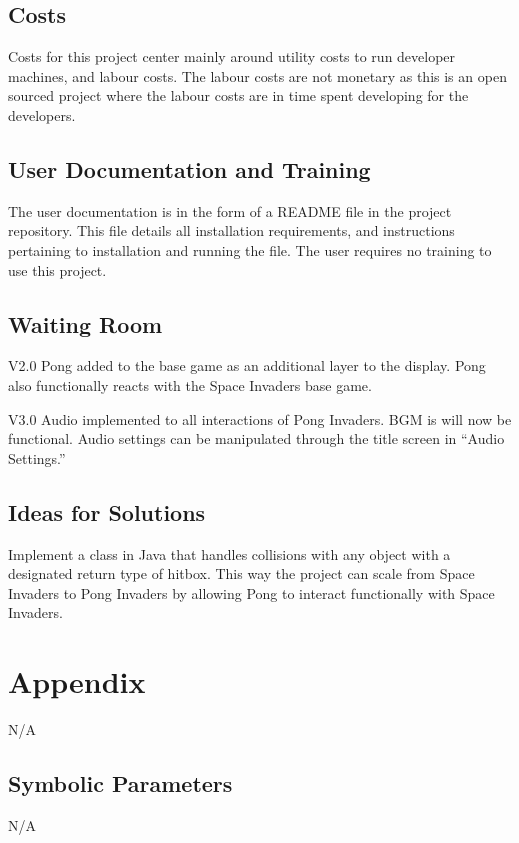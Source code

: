 \documentclass[12pt, titlepage]{article}
\begin{document}
\subsection{Costs}
Costs for this project center mainly around utility costs to run developer machines, and labour costs. The labour costs are not monetary as this is an open sourced project where the labour costs are in time spent developing for the developers.

\subsection{User Documentation and Training}
The user documentation is in the form of a README file in the project repository. This file details all installation requirements, and instructions pertaining to installation and running the file. The user requires no training to use this project.

\subsection{Waiting Room}
V2.0 Pong added to the base game as an additional layer to the display. Pong also functionally reacts with the Space Invaders base game.

V3.0 Audio implemented to all interactions of Pong Invaders. BGM is will now be functional. Audio settings can be manipulated through the title screen in “Audio Settings.”

\subsection{Ideas for Solutions}
Implement a class in Java that handles collisions with any object with a designated return type of hitbox. This way the project can scale from Space Invaders to Pong Invaders by allowing Pong to interact functionally with Space Invaders.



\newpage
\section{Appendix}
N/A
\subsection{Symbolic Parameters}
N/A
\end{document}
